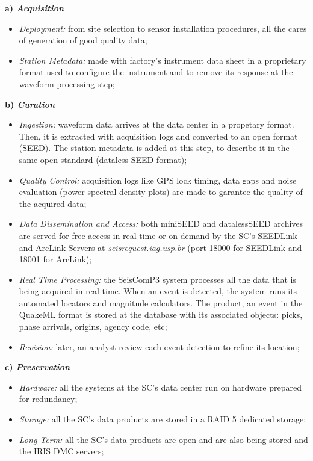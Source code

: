 \documentclass[twoside,letterpaper,twocolumn]{article}
\begin{document}
\textbf{a) \textit{Acquisition}}
\begin{itemize}
\item \textit{Deployment:} from site selection to sensor installation procedures, all the cares of generation of good quality data;
\item\textit{Station Metadata:} made with factory's instrument data sheet in a proprietary format used to configure the instrument and to remove its response at the waveform processing step;
\end{itemize}

\textbf{b) \textit{Curation}}
\begin{itemize}
\item \textit{Ingestion:} waveform data arrives at the data center in a propetary format. Then, it is extracted with acquisition logs and converted to an open format (SEED). The station metadata is added at this step, to describe it in the same open standard (dataless SEED format);
\item \textit{Quality Control:} acquisition logs like GPS lock timing, data gaps and noise evaluation (power spectral density plots) are made to garantee the quality of the acquired data;
\item \textit{Data Dissemination and Access:} both miniSEED and datalessSEED archives are served for free access in real-time or on demand by the SC's SEEDLink and ArcLink Servers at \textit{seisrequest.iag.usp.br} (port 18000 for SEEDLink and 18001 for ArcLink);
\item \textit{Real Time Processing:} the SeisComP3 system processes all the data that is being acquired in real-time. When an event is detected, the system runs its automated locators and magnitude calculators. The product, an event in the QuakeML format is stored at the database with its associated objects: picks, phase arrivals, origins, agency code, etc;
\item \textit{Revision:} later, an analyst review each event detection to refine its location;
\end{itemize}

\textbf{c) \textit{Preservation}}
\begin{itemize}
\item \textit{Hardware:} all the systems at the SC's data center run on hardware prepared for redundancy;
\item\textit{Storage:} all the SC's data products are stored in a RAID 5 dedicated storage;
\item\textit{Long Term:} all the SC's data products are open and are also being stored and the IRIS DMC servers;
\end{itemize}
\end{document}
